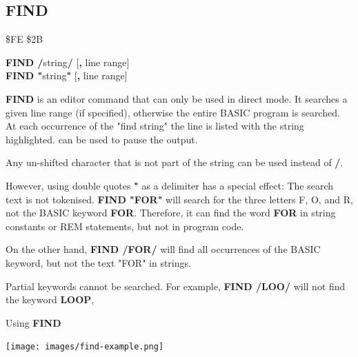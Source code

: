 \subsection{FIND}
\begin{description}[leftmargin=2cm,style=nextline]
\item [Token:] \$FE \$2B
\item [Format:] {\bf FIND /}string{\bf/} [{\bf,} line range] \\
		{\bf FIND "}string{\bf"} [{\bf,} line range]
\item [Usage:]  {\bf FIND} is an editor command that can only be used
                in direct mode. It searches a given line range
                (if specified), otherwise the entire BASIC program is searched.
                At each occurrence of the "find string" the line is
                listed with the string highlighted.
                 can be used to pause the output.

\item [Remarks:] Any un-shifted character that is not part of
                 the string can be used instead of {\bf /}.

                 However, using double quotes {\bf "} as a delimiter has a special effect:
                 The search text is not tokenised.
                 {\bf FIND "FOR"} will search for the three letters F, O, and R, not
                 the BASIC keyword {\bf FOR}. Therefore, it can find the word
                 {\bf FOR} in string constants or REM statements, but not
                 in program code.

                 On the other hand, {\bf FIND /FOR/} will find all occurrences of
                 the BASIC keyword, but not the text "FOR" in strings.

                 Partial keywords cannot be searched. For example,
                 {\bf FIND /LOO/} will not find the keyword {\bf LOOP},


\item [Example:] Using {\bf FIND}
\item \begin{center}\texttt{[image: images/find-example.png]}\end{center}
\end{description}


\newpage
